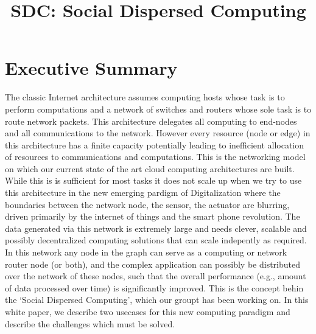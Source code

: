 \documentclass[12pt,letterpaper]{article}
\title{SDC: Social Dispersed Computing}
\date{}
\begin{document}
\maketitle

\section*{Executive Summary}

The classic Internet architecture assumes computing hosts whose task is to perform computations
and a network of switches and routers whose sole task is to route network packets. This architecture delegates all computing to end-nodes and all communications to the network. However every resource (node or edge) in this architecture has a finite capacity potentially leading to inefficient allocation of resources to communications and computations.  This is the networking model on which our current state of the art cloud computing architectures are built. While this is is sufficient for most tasks it does not scale up when we try to use this architecture in the new emerging pardigm of Digitalization where the boundaries between the network node, the sensor, the actuator are blurring, driven primarily by the internet of things and the smart phone revolution. The data generated via this network is extremely large and needs clever, scalable and possibly decentralized computing solutions that can scale indepently as required. In this network any node in the graph can serve as a computing or network
router node (or both), and  the complex application can possibly be distributed over the network
of these nodes, such that the overall performance (e.g., amount of data processed over
time) is significantly improved.  This is the concept behin the `Social Dispersed Computing', which our groupt has been working on. In this white paper, we describe two usecases for this new computing paradigm and describe the challenges which must be solved.
\end{document}
